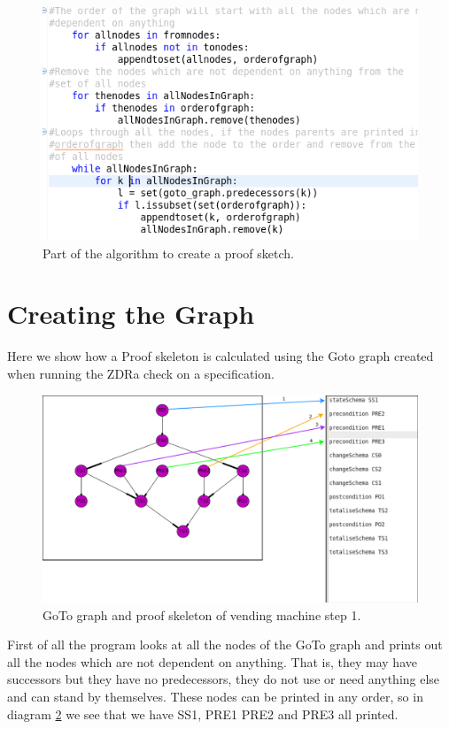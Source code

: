 \begin{figure}[H]
\includegraphics[scale=0.5]{Figures/skeleton/code.png}
\caption{Part of the algorithm to create a proof sketch.}
\label{fig:code}
\end{figure}


\section{Creating the Graph}

Here we show how a Proof skeleton is calculated using the Goto graph created when running the ZDRa check on a specification.

\begin{figure}[H]
\includegraphics[scale=0.3]{Figures/skeleton/1.png}
\caption{GoTo graph and proof skeleton of vending machine step 1.}
\label{fig:1}
\end{figure}

First of all the program looks at all the nodes of the GoTo graph and prints out all the nodes which are not dependent on anything. That is, they may have successors but they have no predecessors, they do not use or need anything else and can stand by themselves. These nodes can be printed in any order, so in diagram \ref{fig:1} we see that we have SS1, PRE1 PRE2 and PRE3 all printed.

